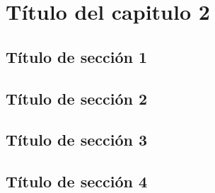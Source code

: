 
\newpage
\clearpage{\pagestyle{empty}\cleardoublepage}
\doublespacing
\chapter{Título del capitulo 2}
\newpage
\pagestyle{myportland}

\section{Título de sección 1}

\section{Título de sección 2}

\section{Título de sección 3}

\section{Título de sección 4}